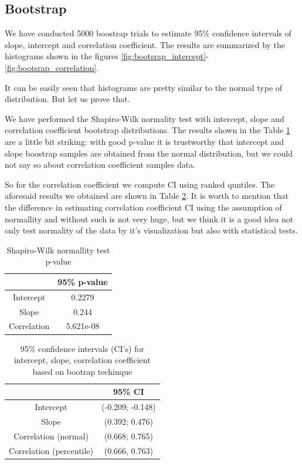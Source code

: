\subsection{Bootstrap}
We have conducted 5000 boostrap trials to estimate 95\%  confidence intervals of slope, intercept and correlation coefficient. 
The results are summarized by the histograms shown in the figures \ref{fig:bootsrap_intercept}-\ref{fig:bootsrap_correlation}. 

It can be easily seen that histograms are pretty similar to the normal type of distribution.  But let us prove that. 

We have  performed   the  Shapiro-Wilk normality test with intercept, slope and correlation coefficient bootstrap distributions. The results shown in the Table \ref{tbl:p_test_shapir_wilks}  are a little bit striking: with good p-value it is  trustworthy that intercept and slope boostrap samples are obtained from the normal distribution, but we could not say so about correlation coefficient samples data.

So for the correlation coefficient we compute CI using ranked quntiles.
The aforesaid results we  obtained are shown  in Table \ref{tbl:conf_intervals_intercept_slope_corr}.
It is worth to mention that the difference in estimating correlation coefficient CI using the assumption of normallity and without such is not very huge, but we think it is a good idea not only test normality of the data by it's visualization but also with statistical tests.

\begin{table}
	\centering
	\caption{Shapiro-Wilk normallity test p-value} \label{tbl:p_test_shapir_wilks} 
	\begin{tabular}{|c|c|}
		\hline  & 95\%  p-value \\ 
		\hline Intercept & 0.2279 \\ 
		\hline Slope  & 0.244  \\ 
		\hline Correlation &  5.621e-08 \\ 
		\hline 
	\end{tabular} 
\end{table} 




\begin{table}
\centering
	\caption{95\% confidence intervals (CI's) for intercept, slope, correlation coefficient based on bootrap techinque} \label{tbl:conf_intervals_intercept_slope_corr} 
\begin{tabular}{|c|c|}
	\hline  & 95\%  CI \\ 
	\hline Intercept &  (-0.209; -0.148) \\ 
	\hline Slope  & (0.392;  0.476)  \\ 
	\hline Correlation (normal) & (0.668; 0.765)   \\ 
	\hline Correlation (percentile) & (0.666,  0.763)   \\ 
	\hline 
\end{tabular} 
\end{table}
 
